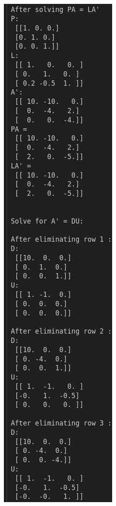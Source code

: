 \documentclass[conference,onecolumn]{IEEEtran}
\begin{document}
\begin{enumerate}[label=\arabic{enumi}.]
\begin{figure}[t]
\begin{minipage}[t]{0.3\textwidth}
              \end{minipage}%
              \begin{minipage}[t]{0.25\textwidth}
                  \centering
                  \includegraphics[width=\textwidth]{figs/LDU2.png}

\end{minipage}
\end{figure}
\end{enumerate}
\end{document}
